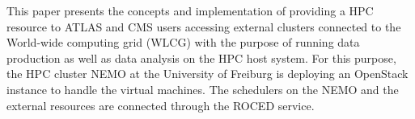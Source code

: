 
This paper presents the concepts and implementation of providing a HPC
resource to ATLAS and CMS users accessing external clusters connected
to the World-wide computing grid (WLCG) with the purpose of running
data production as well as data analysis on the HPC host system.
For this purpose, the HPC cluster NEMO at the University of Freiburg
is deploying an OpenStack instance to handle the virtual machines.
The schedulers on the NEMO and the external resources are connected
through the ROCED service\cite{ROCED}.

